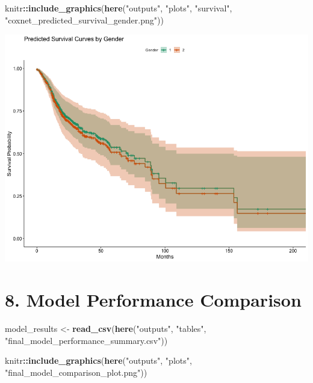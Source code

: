 \documentclass[
  11pt,
]{article}
\newenvironment{Shaded}{\begin{snugshade}}{\end{snugshade}}
\newcommand{\FunctionTok}[1]{\textcolor[rgb]{0.13,0.29,0.53}{\textbf{#1}}}
\newcommand{\NormalTok}[1]{#1}
\newcommand{\OtherTok}[1]{\textcolor[rgb]{0.56,0.35,0.01}{#1}}
\newcommand{\SpecialCharTok}[1]{\textcolor[rgb]{0.81,0.36,0.00}{\textbf{#1}}}
\newcommand{\StringTok}[1]{\textcolor[rgb]{0.31,0.60,0.02}{#1}}
\begin{document}
\begin{Shaded}
\begin{Highlighting}[]
\NormalTok{knitr}\SpecialCharTok{::}\FunctionTok{include\_graphics}\NormalTok{(}\FunctionTok{here}\NormalTok{(}\StringTok{"outputs"}\NormalTok{, }\StringTok{"plots"}\NormalTok{, }\StringTok{"survival"}\NormalTok{, }\StringTok{"coxnet\_predicted\_survival\_gender.png"}\NormalTok{))}
\end{Highlighting}
\end{Shaded}

\includegraphics[width=0.8\linewidth]{../outputs/plots/survival/coxnet_predicted_survival_gender}

\section{8. Model Performance
Comparison}\label{model-performance-comparison}

\begin{Shaded}
\begin{Highlighting}[]
\NormalTok{model\_results }\OtherTok{\textless{}{-}} \FunctionTok{read\_csv}\NormalTok{(}\FunctionTok{here}\NormalTok{(}\StringTok{"outputs"}\NormalTok{, }\StringTok{"tables"}\NormalTok{, }\StringTok{"final\_model\_performance\_summary.csv"}\NormalTok{))}
\end{Highlighting}
\end{Shaded}

\begin{Shaded}
\begin{Highlighting}[]
\NormalTok{knitr}\SpecialCharTok{::}\FunctionTok{include\_graphics}\NormalTok{(}\FunctionTok{here}\NormalTok{(}\StringTok{"outputs"}\NormalTok{, }\StringTok{"plots"}\NormalTok{, }\StringTok{"final\_model\_comparison\_plot.png"}\NormalTok{))}
\end{Highlighting}
\end{Shaded}
\end{document}
